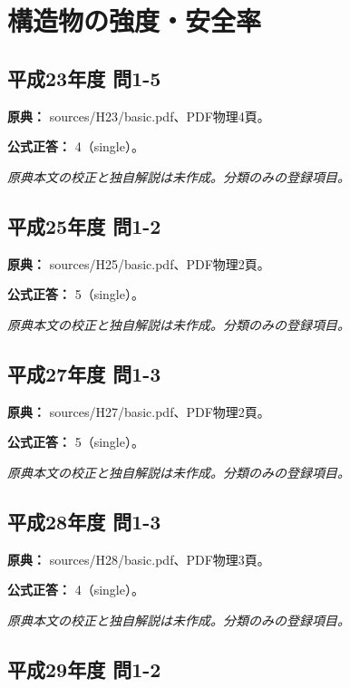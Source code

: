 \section{構造物の強度・安全率}

\subsection{平成23年度 問1-5}
\label{q:h23-reg-basic-1-5}

\noindent\textbf{原典：} sources/H23/basic.pdf、PDF物理4頁。

\textbf{公式正答：} 4（single）。

\par\textit{原典本文の校正と独自解説は未作成。分類のみの登録項目。}

\subsection{平成25年度 問1-2}
\label{q:h25-reg-basic-1-2}

\noindent\textbf{原典：} sources/H25/basic.pdf、PDF物理2頁。

\textbf{公式正答：} 5（single）。

\par\textit{原典本文の校正と独自解説は未作成。分類のみの登録項目。}

\subsection{平成27年度 問1-3}
\label{q:h27-reg-basic-1-3}

\noindent\textbf{原典：} sources/H27/basic.pdf、PDF物理2頁。

\textbf{公式正答：} 5（single）。

\par\textit{原典本文の校正と独自解説は未作成。分類のみの登録項目。}

\subsection{平成28年度 問1-3}
\label{q:h28-reg-basic-1-3}

\noindent\textbf{原典：} sources/H28/basic.pdf、PDF物理3頁。

\textbf{公式正答：} 4（single）。

\par\textit{原典本文の校正と独自解説は未作成。分類のみの登録項目。}

\subsection{平成29年度 問1-2}
\label{q:h29-reg-basic-1-2}

